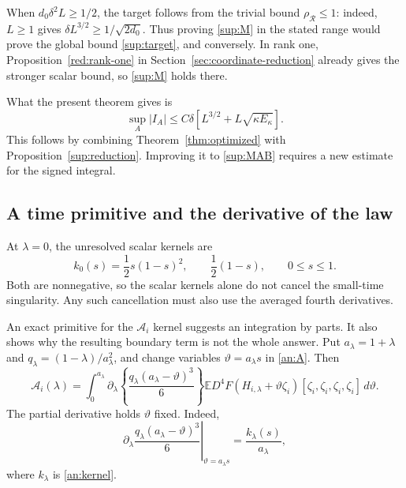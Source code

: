 \documentclass[11pt,a4paper]{article}
\theoremstyle{remark}
\newcommand{\E}{\mathbb E}
\newcommand{\rh}{\rho_{\mathcal R}}
\newcommand{\dd}{\,d}
\begin{document}
When \(d_0\delta^2L\ge1/2\), the target follows from the trivial
bound \(\rh\le1\): indeed, \(L\ge1\) gives
\(\delta L^{3/2}\ge1/\sqrt{2d_0}\).
Thus proving \eqref{sup:M} in the stated range would prove the global
bound \eqref{sup:target}, and conversely. In rank one,
Proposition~\ref{red:rank-one} in
Section~\ref{sec:coordinate-reduction} already gives the stronger scalar
bound, so \eqref{sup:M} holds there.

What the present theorem gives is
\[
 \sup_A|I_A|
 \le C\delta\left[L^{3/2}+L\sqrt{\kappa E_\kappa}\right].
\]
This follows by combining Theorem~\ref{thm:optimized} with
Proposition~\ref{sup:reduction}. Improving it to \eqref{sup:MAB} requires
a new estimate for the signed integral.

\subsection{A time primitive and the derivative of the law}
\label{sup:primitive}

At \(\lambda=0\), the unresolved scalar kernels are
\[
 k_0(s)=\frac12s(1-s)^2,
 \qquad \frac12(1-s),\qquad 0\le s\le1.
\]
Both are nonnegative, so the scalar kernels alone do not cancel the
small-time singularity. Any such cancellation must also use the
averaged fourth derivatives.

An exact primitive for the \(\mathcal A_i\) kernel suggests an integration
by parts. It also shows why the resulting boundary term is not the
whole answer.
Put \(a_\lambda=1+\lambda\) and
\(q_\lambda=(1-\lambda)/a_\lambda^2\), and change variables
\(\vartheta=a_\lambda s\) in \eqref{an:A}. Then
\begin{equation}
 \mathcal A_i(\lambda)=\int_0^{a_\lambda}
  \partial_\lambda\left\{
    \frac{q_\lambda(a_\lambda-\vartheta)^3}{6}\right\}
  \E D^4F(H_{i,\lambda}+\vartheta\zeta_i)
       [\zeta_i,\zeta_i,\zeta_i,\zeta_i]\dd\vartheta.
 \label{sup:primitive-identity}
\end{equation}
The partial derivative holds \(\vartheta\) fixed. Indeed,
\[
 \left.\partial_\lambda
   \frac{q_\lambda(a_\lambda-\vartheta)^3}{6}
 \right|_{\vartheta=a_\lambda s}
 =\frac{k_\lambda(s)}{a_\lambda},
\]
where \(k_\lambda\) is \eqref{an:kernel}.
\end{document}
